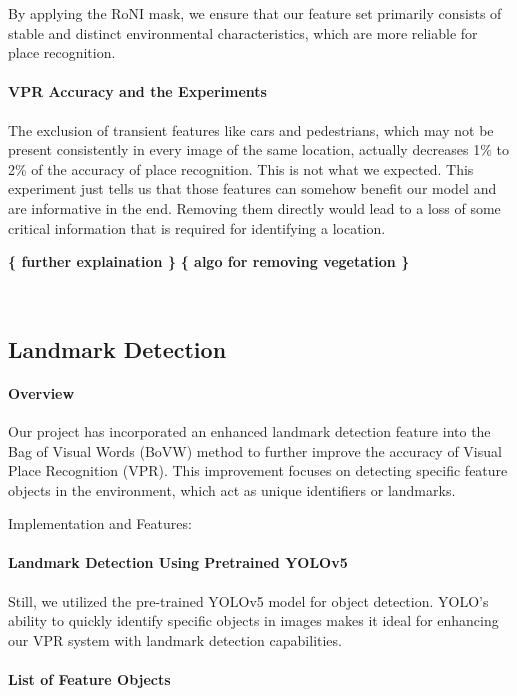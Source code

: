 \documentclass[conference]{IEEEtran}
\begin{document}
By applying the RoNI mask, we ensure that our feature set primarily consists of stable and distinct environmental characteristics, which are more reliable for place recognition.

\paragraph{VPR Accuracy and the Experiments}

The exclusion of transient features like cars and pedestrians, which may not be present consistently in every image of the same location, actually decreases 1\% to 2\% of the accuracy of place recognition. This is not what we expected. This experiment just tells us that those features can somehow benefit our model and are informative in the end. Removing them directly would lead to a loss of some critical information that is required for identifying a location.

\textbf{ \{ further explaination \} }
\textbf{ \{ algo for removing vegetation \} }

\\

\subsection{Landmark Detection}
\paragraph{Overview}
Our project has incorporated an enhanced landmark detection feature into the Bag of Visual Words (BoVW) method to further improve the accuracy of Visual Place Recognition (VPR). This improvement focuses on detecting specific feature objects in the environment, which act as unique identifiers or landmarks.

Implementation and Features:

\paragraph{Landmark Detection Using Pretrained YOLOv5}

Still, we utilized the pre-trained YOLOv5 model for object detection. YOLO's ability to quickly identify specific objects in images makes it ideal for enhancing our VPR system with landmark detection capabilities.

\paragraph{List of Feature Objects}
\end{document}

